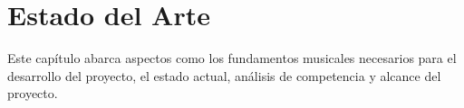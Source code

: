 \chapter{Estado del Arte}
Este capítulo abarca aspectos como los fundamentos musicales necesarios para el desarrollo del proyecto, el estado actual, análisis de competencia y alcance del proyecto.





